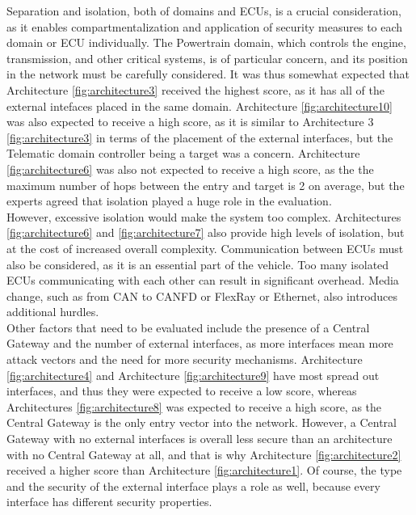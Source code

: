 Separation and isolation, both of domains and ECUs, is a crucial consideration, as it enables compartmentalization and application of security measures to each domain or ECU individually. 
The Powertrain domain, which controls the engine, transmission, and other critical systems, is of particular concern, and its position in the network must be carefully considered. 
It was thus somewhat expected that Architecture \ref{fig:architecture3} received the highest score, as it has all of the external intefaces placed in the same domain.
Architecture \ref{fig:architecture10} was also expected to receive a high score, as it is similar to Architecture 3 \ref{fig:architecture3} in terms of the placement of the external interfaces,
but the Telematic domain controller being a target was a concern.
Architecture \ref{fig:architecture6} was also not expected to receive a high score, as the the maximum number of hops between the entry and target is 2 on average,
but the experts agreed that isolation played a huge role in the evaluation.\\

However, excessive isolation would make the system too complex. 
Architectures \ref{fig:architecture6} and \ref{fig:architecture7} also provide high levels of isolation, but at the cost of increased overall complexity.
Communication between ECUs must also be considered, as it is an essential part of the vehicle. 
Too many isolated ECUs communicating with each other can result in significant overhead. 
Media change, such as from CAN to CANFD or FlexRay or Ethernet, also introduces additional hurdles.\\

Other factors that need to be evaluated include the presence of a Central Gateway and the number of external interfaces, as more interfaces mean more attack vectors and the need for more security mechanisms.
Architecture \ref{fig:architecture4} and Architecture \ref{fig:architecture9} have most spread out interfaces, and thus they were expected to receive a low score,
whereas Architectures \ref{fig:architecture8} was expected to receive a high score, as the Central Gateway is the only entry vector into the network.
However, a Central Gateway with no external interfaces is overall less secure than an architecture with no Central Gateway at all, and that is why 
Architecture \ref{fig:architecture2} received a higher score than Architecture \ref{fig:architecture1}. 
Of course, the type and the security of the external interface plays a role as well, because every interface has different security properties.\\

